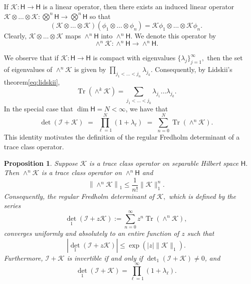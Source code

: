 \documentclass{birkjour}
\newtheorem{prop}[thm]{Proposition}
\theoremstyle{definition}
\theoremstyle{remark}
\numberwithin{equation}{section}
\newcommand{\sH}{{\mathsf H}}
\newcommand{\Tr}{{\operatorname{Tr}}}
\begin{document}
If $\mathcal{K} : \sH \rightarrow \sH$ is a linear operator, then there exists an induced linear operator $\mathcal{K} \otimes \dots \otimes \mathcal{K} : \bigotimes^n \sH \rightarrow \bigotimes^n \sH$ so that 
\begin{equation}\label{Kcrossphi}
    (\mathcal{K} \otimes \dots \otimes \mathcal{K})(\phi_1 \otimes \dots \otimes \phi_n) = \mathcal{K}\phi_1 \otimes \dots \otimes \mathcal{K}\phi_n.
\end{equation}
Clearly, $\mathcal{K} \otimes \dots \otimes \mathcal{K}$ maps $\wedge^n \sH$ into $\wedge^n \sH.$ We denote this operator by 
\begin{equation}
 {\wedge}^n\mathcal{K} : {\wedge}^n \sH \rightarrow {\wedge}^n \sH.
\end{equation}

We observe that if $\mathcal{K} : \sH \rightarrow \sH$ is compact with eigenvalues $\{\lambda_j\}_{j=1}^{\infty},$ then the set of eigenvalues of $\wedge^n\mathcal{K}$ is given by $\prod_{j_1 < \dots < j_n} \lambda_{j_k}$. Consequently, by  Lidskii's theorem\eqref{eq:lidskii}, 
\begin{equation}
    \Tr({\wedge}^k\mathcal{K}) = \sum_{j_1 < \dots < j_k} \lambda_{j_1} \dots \lambda_{j_k}.
\end{equation}
In the special case that $\dim \sH = N < \infty$,  we have that
\begin{equation}\label{tracedet}
\det(\mathcal{I} + \mathcal{K}) \,\,=\,\,  \prod_{\ell=1}^N (1 + \lambda_\ell) 
\,\,=\,\,   \sum_{n=0}^N \Tr({\wedge}^n\mathcal{K}).
\end{equation}
This identity motivates the definition of the regular Fredholm determinant
of  a trace class operator. 


\begin{prop}\cite[Lemma~3.3, Theorems 3.5 and 3.7]{Simon}
Suppose $\mathcal{K}$ is a trace class operator on separable Hilbert space $\sH.$ Then $\wedge^n\mathcal{K}$ is a trace class operator on $\wedge^n \sH$ and
 \begin{equation}
     \left\|{\wedge}^n\mathcal{K}\right\|_1 \leq \frac{1}{n!}\|\mathcal{K}\|_1^n.
 \end{equation}
 Consequently, the regular Fredholm determinant of $\mathcal{K},$ which is 
 defined by the series
 \begin{equation}
     {\det}_1(\mathcal{I} + z\mathcal{K}) := \sum_{n=0}^{\infty}z^n \Tr({\wedge}^n\mathcal{K}),
 \end{equation}
 converges uniformly and absolutely  to an entire function of $z$ such that
 \begin{equation}
     |{\det}_1(\mathcal{I} +z\mathcal{K})| \leq \exp(|z|\|\mathcal{K}\|_1).
 \end{equation}
Furthermore,
 $\mathcal{I} + \mathcal{K}$ is invertible if and only if ${\det}_1(\mathcal{I} + \mathcal{K}) \neq 0$, and 
 \begin{equation}
 {\det}_1(\mathcal{I} + \mathcal{K}) = \prod_{\ell=1}^\infty (1 + \lambda_\ell).
 \end{equation}
\end{prop}
\end{document}
